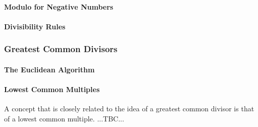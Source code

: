 



\paragraph{Modulo for Negative Numbers}



\paragraph{Divisibility Rules}

\subsubsection{Greatest Common Divisors}


\paragraph{The Euclidean Algorithm}



\paragraph{Lowest Common Multiples}
A concept that is closely related to the idea of a greatest common divisor is that of a lowest common multiple. ...TBC...



